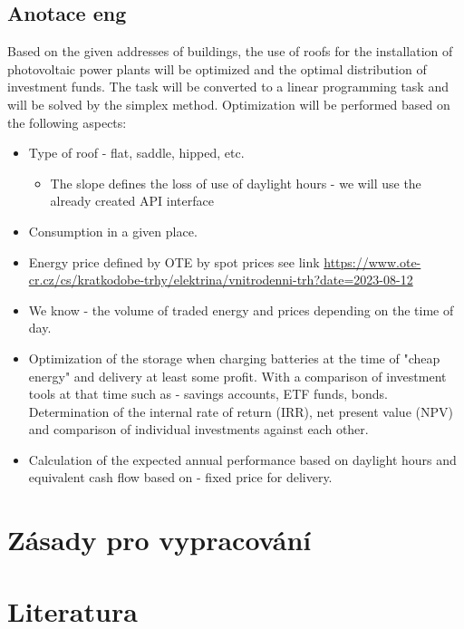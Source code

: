 \documentclass[a4paper, 12pt]{article}
\begin{document}
\subsection*{Anotace eng}
Based on the given addresses of buildings, the use of roofs for the installation of photovoltaic power plants will be optimized and the optimal distribution of investment funds. The task will be converted to a linear programming task and will be solved by the simplex method. Optimization will be performed based on the following aspects:
\begin{itemize}

    \item Type of roof - flat, saddle, hipped, etc.
          \begin{itemize}
              \item The slope defines the loss of use of daylight hours - we will use the already created API interface
          \end{itemize}
    \item Consumption in a given place.
    \item Energy price defined by OTE by spot prices see link \url{https://www.ote-cr.cz/cs/kratkodobe-trhy/elektrina/vnitrodenni-trh?date=2023-08-12}
    \item We know - the volume of traded energy and prices depending on the time of day.
    \item Optimization of the storage when charging batteries at the time of "cheap energy" and delivery at least some profit. With a comparison of investment tools at that time such as - savings accounts, ETF funds, bonds. Determination of the internal rate of return (IRR), net present value (NPV) and comparison of individual investments against each other.
    \item Calculation of the expected annual performance based on daylight hours and equivalent cash flow based on - fixed price for delivery.

\end{itemize}

\section{Zásady pro vypracování}

    
\section{Literatura}
\end{document}

